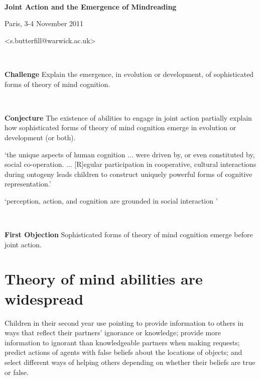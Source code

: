 \documentclass[11pt]{extarticle}
\date{}
\begin{document}
\begin{multicols}{3}

\setlength\footnotesep{1em}






\

\begin{center}
{\Large
\textbf{Joint Action and the Emergence of Mindreading}
}

Paris, 3-4 November 2011


<s.butterfill@warwick.ac.uk>

\end{center}


\ 

{\Large
\textbf{Challenge}
Explain the emergence, in evolution or development, of sophisticated forms of theory of mind cognition.
}

\ 

{\Large
\textbf{Conjecture}
The existence of abilities to engage in joint action partially explain how sophisticated forms of theory of mind cognition emerge in evolution or development (or both).
}

`the unique aspects of human cognition ... were driven by, or even constituted by, social co-operation. ...
[R]egular participation in cooperative, cultural interactions during ontogeny leads children to construct uniquely powerful forms of cognitive representation.'
\citep%
{Moll:2007gu}



`perception, action, and cognition are grounded in social interaction%
'\citep%
{Knoblich:2006bn}


\ 

{\Large
\textbf{First Objection}
Sophisticated forms of theory of mind cognition emerge before joint action.
}


\section{Theory of mind abilities are widespread}
Children in their second year use pointing to provide information to others\citep{Liszkowski:2006ec} in ways that reflect their partners’ ignorance or knowledge;\citep{Liszkowski:2008al} provide more information to ignorant than knowledgeable partners when making requests;\citep{ONeill:1996um}  predict actions of agents with false beliefs about the locations of objects;\citep{Onishi:2005hm,Southgate:2007js} and select different ways of helping others depending on whether their beliefs are true or false.\citep{Buttelmann:2009gy}


\end{multicols}
\end{document}
